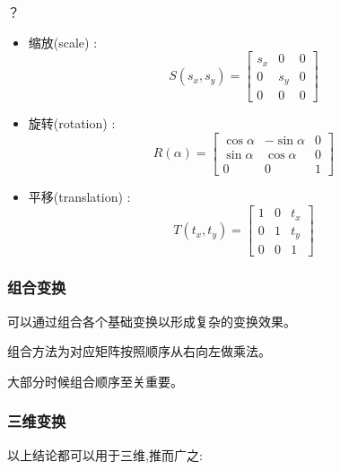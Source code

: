 \documentclass[UTF8]{ctexbook}
\begin{document}
{{{{        {？}
        \begin{itemize}
          \item 缩放(scale) : $$S(s_x, s_y) = \left[\begin{matrix}
                      s_x & 0   & 0 \\
                      0   & s_y & 0 \\
                      0   & 0   & 0
                    \end{matrix}\right]$$
          \item 旋转(rotation) : $$R(\alpha) = \left[\begin{matrix}
                      \cos\alpha & -\sin\alpha & 0 \\
                      \sin\alpha & \cos\alpha  & 0 \\
                      0          & 0           & 1
                    \end{matrix}\right]$$
          \item 平移(translation) : $$T(t_x, t_y) = \left[\begin{matrix}
                      1 & 0 & t_x \\
                      0 & 1 & t_y \\
                      0 & 0 & 1
                    \end{matrix}\right]$$
        \end{itemize}

      }%

      \subsubsection{组合变换}{
        可以通过组合各个基础变换以形成复杂的变换效果。

        组合方法为对应矩阵按照顺序从右向左做乘法。

        大部分时候组合顺序至关重要。

      }%

      \subsubsection{三维变换}{
        以上结论都可以用于三维,推而广之:\\

}}}}
\end{document}
